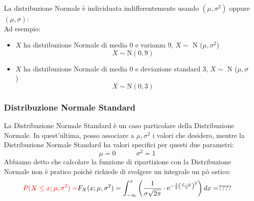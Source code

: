 \documentclass{article}  %
\theoremstyle{definition}
\begin{document}
\begin{esempio}[Attenzione!]
	La distribuzione Normale è individuata indifferentemente usando $(\mu, \sigma^2)$ oppure $(\mu, \sigma)$: \\
	Ad esempio:
	\begin{itemize}
		\item $X$ ha distribuzione Normale di media 0 e varianza 9, $X \sim$ N ($\mu,\sigma^2$)
		      \[
			      X \sim \text{N} (0,9)
		      \]
		\item $X$ ha distribuzione Normale di media 0 e deviazione standard 3, $X \sim$ N ($\mu,\sigma$)
		      \[
			      X \sim \text{N} (0,3)
		      \]
	\end{itemize}
\end{esempio}

\subsubsection{Distribuzione Normale Standard}
La Distribuzione Normale Standard è un caso particolare della Distribuzione Normale. In quest'ultima, posso associare a $\mu,\sigma^2$ i valori che desidero, mentre
la Distribuzione Normale Standard ha valori specifici per questi due parametri:
\[
	\mu=0 \quad \quad \quad \sigma^2=1
\]
Abbiamo detto che calcolare la funzione di ripartizione con la Distribuzione Normale non è pratico poichè richiede di svolgere un integrale un pò ostico:
\[
	\textcolor{red}{P(X \leq x;\mu,\sigma^2)=}F_X(x; \mu,\sigma^2)=\int_{-\infty}^{x}\left(\frac{1}{\sigma \sqrt{2 \pi}}\cdot \mathrm{e}^{-\frac{1}{2}\left(\frac{x-\mu}{\sigma}\right)^2}\right)dx=????
\]
\end{document}
